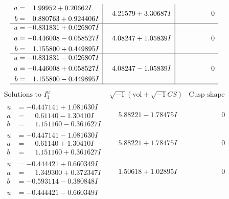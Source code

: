 \documentclass[1p]{elsarticle_modified}
\theoremstyle{definition}
\newcommand{\I}{\sqrt{-1}}
\begin{document}
$$\begin{array}{c|c|c}
\begin{aligned}
a &= \phantom{-}1.99952 + 0.20662 I \\
b &= \phantom{-}0.880763 + 0.924406 I\end{aligned}
 & \phantom{-}4.21579 + 3.30687 I & \phantom{-0.000000 } 0 \\ \hline\begin{aligned}
u &= -0.831831 + 0.026807 I \\
a &= -0.446008 - 0.058527 I \\
b &= \phantom{-}1.155800 + 0.449895 I\end{aligned}
 & \phantom{-}4.08247 + 1.05839 I & \phantom{-0.000000 } 0 \\ \hline\begin{aligned}
u &= -0.831831 - 0.026807 I \\
a &= -0.446008 + 0.058527 I \\
b &= \phantom{-}1.155800 - 0.449895 I\end{aligned}
 & \phantom{-}4.08247 - 1.05839 I & \phantom{-0.000000 } 0\\
 \hline 
 \end{array}$$\newpage$$\begin{array}{c|c|c}  
\text{Solutions to }I^u_{1}& \I (\text{vol} + \sqrt{-1}CS) & \text{Cusp shape}\\
 \hline 
\begin{aligned}
u &= -0.447141 + 1.081630 I \\
a &= \phantom{-}0.61140 - 1.30410 I \\
b &= \phantom{-}1.151160 - 0.361627 I\end{aligned}
 & \phantom{-}5.88221 - 1.78475 I & \phantom{-0.000000 } 0 \\ \hline\begin{aligned}
u &= -0.447141 - 1.081630 I \\
a &= \phantom{-}0.61140 + 1.30410 I \\
b &= \phantom{-}1.151160 + 0.361627 I\end{aligned}
 & \phantom{-}5.88221 + 1.78475 I & \phantom{-0.000000 } 0 \\ \hline\begin{aligned}
u &= -0.444421 + 0.660349 I \\
a &= \phantom{-}1.349300 + 0.372347 I \\
b &= -0.593114 - 0.380848 I\end{aligned}
 & \phantom{-}1.50618 + 1.02895 I & \phantom{-0.000000 } 0 \\ \hline\begin{aligned}
u &= -0.444421 - 0.660349 I \\

\end{aligned}
\end{array}$$
\end{document}
